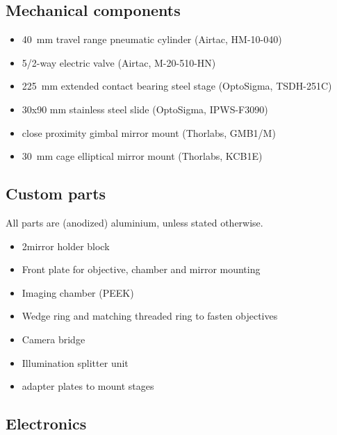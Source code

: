 \begin{singlespace}
\subsection*{Mechanical components}
  \begin{itemize}
    \item \SI{40}{mm} travel range pneumatic cylinder (Airtac, HM-10-040)
    \item 5/2-way electric valve (Airtac, M-20-510-HN)
    \item 2\texttimes \SI{25}{mm} extended contact bearing steel stage (OptoSigma,  TSDH-251C)
    \item 30x90 mm stainless steel slide (OptoSigma,  IPWS-F3090)
    \item close proximity gimbal mirror mount (Thorlabs, GMB1/M)
    \item \SI{30}{mm} cage elliptical mirror mount (Thorlabs, KCB1E)
  \end{itemize}

\subsection*{Custom parts}
  All parts are (anodized) aluminium, unless stated otherwise.
  \begin{itemize}
    \item 2\texttimes mirror holder block
    \item Front plate for objective, chamber and mirror mounting
    \item Imaging chamber (PEEK)
    \item Wedge ring and matching threaded ring to fasten objectives
    \item Camera bridge
    \item Illumination splitter unit
    \item adapter plates to mount stages
  \end{itemize}

\subsection*{Electronics}


\end{singlespace}
